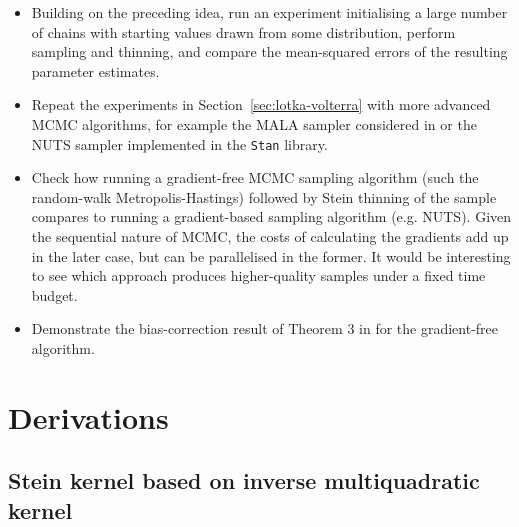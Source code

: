 \documentclass[11pt,a4paper]{report}
\begin{document}
\begin{itemize}
\item Building on the preceding idea, run an experiment initialising a large number of chains with starting values drawn from some distribution, perform sampling and thinning, and compare the mean-squared errors of the resulting parameter estimates.

\item Repeat the experiments in Section~\ref{sec:lotka-volterra} with more advanced MCMC algorithms, for example the MALA sampler considered in \cite{riabizOptimalThinningMCMC2022} or the NUTS sampler implemented in the \texttt{Stan} library.

\item Check how running a gradient-free MCMC sampling algorithm (such the random-walk Metropolis-Hastings) followed by Stein thinning of the sample compares to running a gradient-based sampling algorithm (e.g. NUTS). Given the sequential nature of MCMC, the costs of calculating the gradients add up in the later case, but can be parallelised in the former. It would be interesting to see which approach produces higher-quality samples under a fixed time budget.

\item Demonstrate the bias-correction result of Theorem 3 in \cite{riabizOptimalThinningMCMC2022} for the gradient-free algorithm.

\end{itemize}




\appendix
\chapter{Derivations}
\label{appendix:derivations}

\section{Stein kernel based on inverse multiquadratic kernel}
\label{appendix:derivations:imq-stein}
\end{document}
